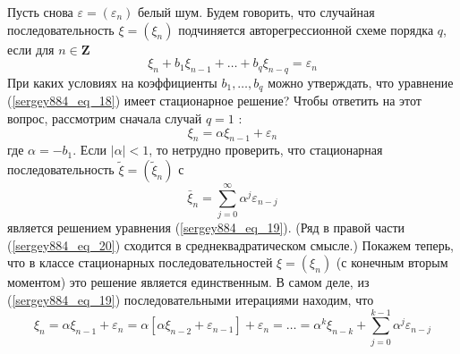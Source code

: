 Пусть снова $\varepsilon=\left(\varepsilon_n\right)$ белый шум. Будем говорить, что случайная последовательность $\xi=\left(\xi_n\right)$ подчиняется авторегрессионной схеме порядка $q$, если для $n \in \mathbf{Z}$
\begin{equation}\label{sergey884_eq_18}
\xi_n+b_1 \xi_{n-1}+\ldots+b_q \xi_{n-q}=\varepsilon_n
\end{equation}
При каких условиях на коэффициенты $b_1, \ldots, b_q$ можно утверждать, что уравнение (\ref{sergey884_eq_18}) имеет стационарное решение? Чтобы ответить на этот вопрос, рассмотрим сначала случай $q=1$ :
\begin{equation}\label{sergey884_eq_19}
\xi_n=\alpha \xi_{n-1}+\varepsilon_n
\end{equation}
где $\alpha=-b_1$. Если $|\alpha|<1$, то нетрудно проверить, что стационарная последовательность $\tilde{\xi}=\left(\tilde{\xi}_n\right)$ с
\begin{equation}\label{sergey884_eq_20}
\bar{\xi}_n=\sum_{j=0}^{\infty} \alpha^j \varepsilon_{n-j}
\end{equation}
является решением уравнения (\ref{sergey884_eq_19}). (Ряд в правой части (\ref{sergey884_eq_20}) сходится в среднеквадратическом смысле.) Покажем теперь, что в классе стационарных последовательностей $\xi=\left(\xi_n\right)$ (с конечным вторым моментом) это решение является единственным. В самом деле, из (\ref{sergey884_eq_19}) последовательными итерациями находим, что
$$
\xi_n=\alpha \xi_{n-1}+\varepsilon_n=\alpha\left[\alpha \xi_{n-2}+\varepsilon_{n-1}\right]+\varepsilon_n=\ldots=\alpha^k \xi_{n-k}+\sum_{j=0}^{k-1} \alpha^j \varepsilon_{n-j}
$$

